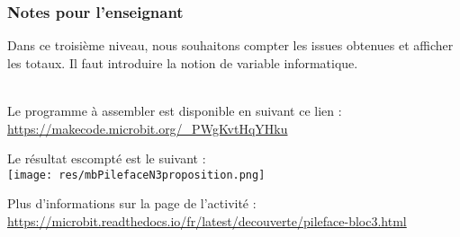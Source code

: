 \newpage
\subsubsection{Notes pour l'enseignant}

Dans ce troisième niveau, nous souhaitons compter les issues obtenues et afficher les totaux.
Il faut introduire la notion de variable informatique.


~\\ Le programme à assembler est disponible en suivant ce lien :
~\\ \url{https://makecode.microbit.org/_PWgKvtHqYHku}



\begin{methode}
Le résultat escompté est le suivant :\\
\texttt{[image: res/mbPilefaceN3proposition.png]}
\end{methode}

\begin{remarque}
Plus d'informations sur la page de l'activité :\\ \url{https://microbit.readthedocs.io/fr/latest/decouverte/pileface-bloc3.html}
\end{remarque}


